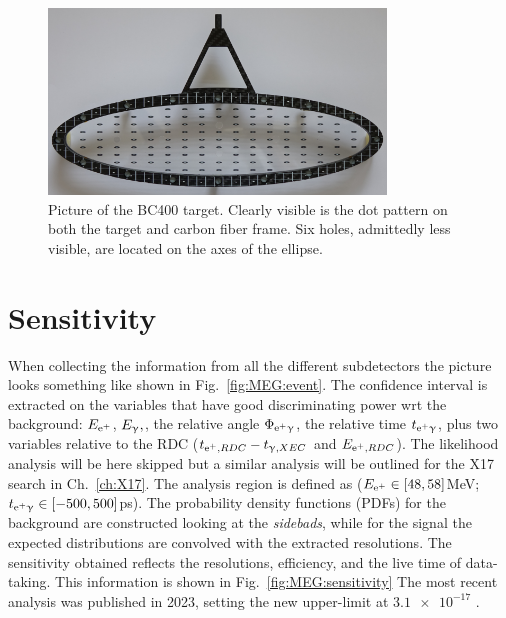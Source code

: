 \begin{refsection}
        \begin{figure}
            \centering
            \includegraphics[width = 0.8\textwidth]{Figures/MEG/meg_target.png}
            \caption{Picture of the BC400 target. Clearly visible is the dot pattern on both the target and carbon fiber frame. Six holes, admittedly less visible, are located on the axes of the ellipse.}
            \label{fig:meg:target}
        \end{figure}

\section{Sensitivity}  
    When collecting the information from all the different subdetectors the picture looks something like shown in Fig.~\ref{fig:MEG:event}.
    The confidence interval is extracted on the variables that have good discriminating power wrt the background: $E_{\text{e}^+}$, $E_\upgamma,$, the relative angle $\Phi_{\text{e}^+\upgamma}$, the relative time $t_{\text{e}^+\upgamma}$, plus two variables relative to the RDC ($t_{\text{e}^+, RDC}-t_{\upgamma, XEC}$ and $E_{\text{e}^+, RDC}$).
    The likelihood analysis will be here skipped but a similar analysis will be outlined for the X17 search in Ch.~\ref{ch:X17}.
    The analysis region is defined as ($E_{\text{e}^+}\in[48,58]$MeV; $t_{\text{e}^+\upgamma}\in[-500,500]$ps).
    The probability density functions (PDFs) for the background are constructed looking at the \textit{sidebads}, while for the signal the expected distributions are convolved with the extracted resolutions.
    The sensitivity obtained reflects the resolutions, efficiency, and the live time of data-taking. 
    This information is shown in Fig.~\ref{fig:MEG:sensitivity}
    The most recent analysis was published in 2023, setting the new upper-limit at $\num{3.1e-17}$ \cite{MEG_II:physics}.
    

\end{refsection}
